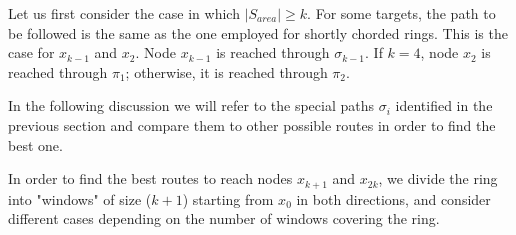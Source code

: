 \medbreak
{}  Let us first consider the case in which $\left\vert{S_{area}}\right\vert \ge k$. 
  For some targets, the path to be followed is the same as the one employed for shortly chorded rings. This is the case for $x_{k-1}$ and $x_2$. Node  $x_{k-1}$  is reached through $\sigma_{k-1}$.  If  $k = 4$,  node $x_{2}$  is reached through $  \pi_{1} $; otherwise, it is reached through $\pi_2$.


In the following discussion we will refer to the special paths  $\sigma_i$  identified in the  previous section  and compare them to other possible routes in order to find the best one.

 In order to find the best routes to reach nodes $x_{k+1}$ and $x_{2k}$, we divide the ring into "windows" of size ($k+1$) starting from $x_0$ in both directions, and consider different cases depending on the number of windows covering the ring.

